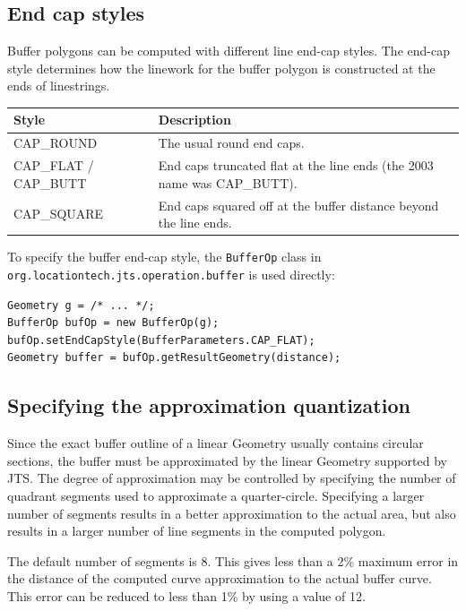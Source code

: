 \documentclass[11pt]{article}
\begin{document}
\subsection{End cap styles}
Buffer polygons can be computed with different line end-cap styles.
The end-cap style determines how the linework for the buffer polygon
is constructed at the ends of linestrings.

\begin{center}
\begin{tabular}{>{\raggedright\arraybackslash}p{3.6cm}p{9.6cm}}
  \toprule
  \textbf{Style} & \textbf{Description} \\
  \midrule
  CAP\_ROUND          & The usual round end caps. \\
  CAP\_FLAT / CAP\_BUTT & End caps truncated flat at the line ends
                         (the 2003 name was CAP\_BUTT). \\
  CAP\_SQUARE         & End caps squared off at the buffer distance
                         beyond the line ends. \\
  \bottomrule
\end{tabular}
\end{center}

To specify the buffer end-cap style, the \texttt{BufferOp} class in
\texttt{org.locationtech.jts.operation.buffer} is used directly:

\begin{lstlisting}
Geometry g = /* ... */;
BufferOp bufOp = new BufferOp(g);
bufOp.setEndCapStyle(BufferParameters.CAP_FLAT);
Geometry buffer = bufOp.getResultGeometry(distance);
\end{lstlisting}

\subsection{Specifying the approximation quantization}
Since the exact buffer outline of a linear Geometry usually contains
circular sections, the buffer must be approximated by the linear
Geometry supported by JTS. The degree of approximation may be
controlled by specifying the number of quadrant segments used to
approximate a quarter-circle. Specifying a larger number of segments
results in a better approximation to the actual area, but also
results in a larger number of line segments in the computed polygon.

The default number of segments is 8. This gives less than a 2\%
maximum error in the distance of the computed curve approximation to
the actual buffer curve. This error can be reduced to less than 1\%
by using a value of 12.
\end{document}
